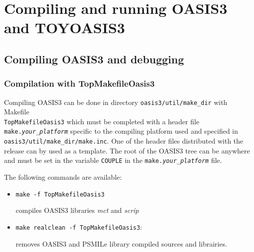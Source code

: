 \newpage
%

\chapter{Compiling and running OASIS3 and TOYOASIS3}
\label{sec_compilationrunning}

\section{Compiling OASIS3 and debugging}
\label{subsec_compile}



\subsection{Compilation with TopMakefileOasis3}
\label{sec_notSCE}

Compiling OASIS3 can be done in directory {\tt oasis3/util/make\_dir}
with Makefile \\ {\tt TopMakefileOasis3} which must be completed with a header file {\tt
  make.{\it your\_platform}} specific to the compiling platform used
and specified in {\tt oasis3/util/make\_dir/make.inc}.  One of the
header files distributed with the release can by used as a template.  The root 
of the OASIS3 tree
can be anywhere and must be set in the variable {\tt COUPLE} in the
{\tt make.{\it your\_platform}} file. 

The following commands are available:

\begin{itemize}
\item {\tt make -f TopMakefileOasis3} 

  compiles OASIS3 libraries {\it mct} and {\it scrip} 

%

\item {\tt make realclean -f  TopMakefileOasis3}: 

  removes OASIS3 and PSMILe library compiled sources and librairies.

\end{itemize}

